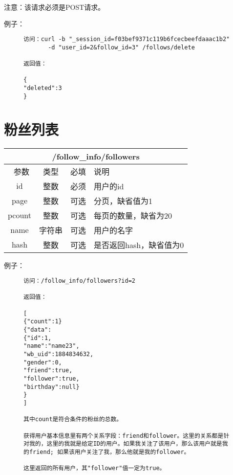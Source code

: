 \documentclass[cs4size]{ctexartutf8}
\begin{document}
注意：该请求必须是POST请求。

例子：

\begin{figure}[H]
\begin{verbatim}
访问：curl -b "_session_id=f03bef9371c119b6fcecbeefdaaac1b2"
       -d "user_id=2&follow_id=3" /follows/delete

返回值：

{
"deleted":3
}

\end{verbatim}
\end{figure}





\section{粉丝列表}

\begin{table}[H]
   \begin{center}
\begin{tabular}{|c|c|c|p{12cm}|}
\hline
\multicolumn{4}{|c|}{/follow\_info/followers} \\
\hline\hline
 \  参数  & 类型 & 必填 &  说明  \\
\hline
 id  & 整数 & 必须 & 用户的id\\
   \hline
 page  & 整数 & 可选 & 分页，缺省值为1\\ 
 \hline
 pcount  & 整数 & 可选 & 每页的数量，缺省为20\\ 
    \hline
 name  & 字符串 & 可选 & 用户的名字\\ 
    \hline    
 hash  & 整数 & 可选 & 是否返回hash，缺省值为0\\ 
\hline

\end{tabular}
   \end{center}
\end{table}

例子：

\begin{figure}[H]
\begin{verbatim}
访问：/follow_info/followers?id=2

返回值：

[
{"count":1}
{"data":
{"id":1,
"name":"name23",
"wb_uid":1884834632,
"gender":0,
"friend":true,
"follower":true,
"birthday":null}
}
]

其中count是符合条件的粉丝的总数。

获得用户基本信息里有两个关系字段：friend和follower。这里的关系都是针对我的，这里的我就是给定ID的用户。如果我关注了该用户，那么该用户就是我的friend; 如果该用户关注了我，那么他就是我的follower。

这里返回的所有用户，其"follower"值一定为true。


\end{verbatim}
\end{figure}
\end{document}
